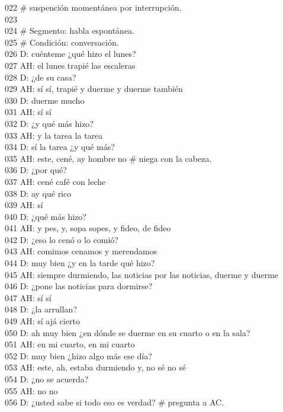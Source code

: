 022 \# suspención momentánea por interrupción.\\
023 \\
024 \# Segmento: habla espontánea.\\
025 \# Condición: conversación.\\
026 D: cuénteme ¿qué hizo el lunes?\\
027 AH: el lunes trapié las escaleras\\
028 D: ¿de su casa?\\
029 AH: sí sí, trapié y duerme y duerme también\\
030 D: duerme mucho\\
031 AH: sí sí\\
032 D: ¿y qué más  hizo?\\
033 AH: y la tarea la tarea\\
034 D: sí la tarea ¿y qué más?\\
035 AH: este, cené, ay hombre no \# niega con la cabeza.\\
036 D: ¿por qué?\\
037 AH: cené café con leche\\
038 D: ay qué rico\\
039 AH: sí\\
040 D: ¿qué más hizo?\\
041 AH: y pes, y, sopa sopes, y fideo, de fideo\\
042 D: ¿eso lo cenó o lo comió?\\
043 AH: comimos cenamos y merendamos\\
044 D: muy bien ¿y en la tarde qué hizo?\\
045 AH: siempre durmiendo, las noticias por las noticias, duerme y duerme\\
046 D: ¿pone las noticias para dormirse?\\
047 AH: sí sí\\
048 D: ¿la arrullan?\\
049 AH: sí ajá cierto\\
050 D: ah muy bien ¿en dónde se duerme en su cuarto o en la sala?\\
051 AH: en mi cuarto, en mi cuarto\\
052 D: muy bien ¿hizo algo más ese día?\\
053 AH: este, ah, estaba durmiendo y, no sé no sé\\
054 D: ¿no se acuerda?\\
055 AH: no no\\
056 D: ¿usted sabe si todo eso es verdad? \# pregunta a AC.\\
